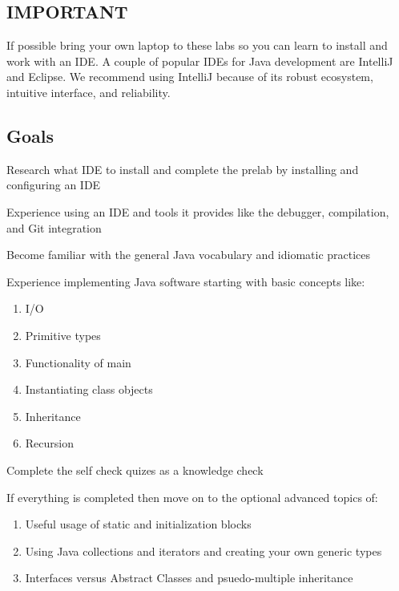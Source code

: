 \documentclass[../../main.tex]{subfiles}
\begin{document}
\subsection{IMPORTANT}
If possible bring your own laptop to these labs so you can learn
to install and work with an IDE. A couple of popular IDEs for Java
development are IntelliJ and Eclipse. We recommend using IntelliJ
because of its robust ecosystem, intuitive interface, and reliability.

\subsection{Goals}

\begin{steps}
   \item Research what IDE to install and complete the prelab by installing and configuring an IDE
   \item Experience using an IDE and tools it provides like the debugger, compilation, and Git integration
   \item Become familiar with the general Java vocabulary and idiomatic practices
   \item Experience implementing Java software starting with basic concepts like:
   \begin{enumerate}[label=\Alph*.]
         \item I/O
         \item Primitive types
         \item Functionality of main
         \item Instantiating class objects
         \item Inheritance
         \item Recursion
      \end{enumerate}
   \item Complete the self check quizes as a knowledge check
   \item If everything is completed then move on to the optional advanced topics of:
   \begin{enumerate}[label=\Alph*.]
         \item Useful usage of static and initialization blocks
         \item Using Java collections and iterators and creating your own generic types
         \item Interfaces versus Abstract Classes and psuedo-multiple inheritance
      \end{enumerate}
\end{steps}
\end{document}
